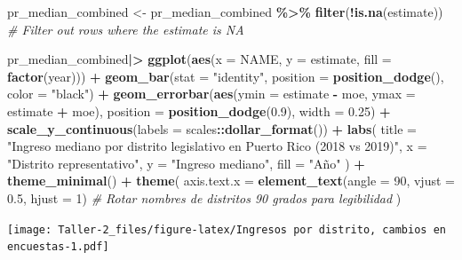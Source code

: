 \documentclass[
]{article}
\newenvironment{Shaded}{\begin{snugshade}}{\end{snugshade}}
\newcommand{\AttributeTok}[1]{\textcolor[rgb]{0.13,0.29,0.53}{#1}}
\newcommand{\CommentTok}[1]{\textcolor[rgb]{0.56,0.35,0.01}{\textit{#1}}}
\newcommand{\DecValTok}[1]{\textcolor[rgb]{0.00,0.00,0.81}{#1}}
\newcommand{\FloatTok}[1]{\textcolor[rgb]{0.00,0.00,0.81}{#1}}
\newcommand{\FunctionTok}[1]{\textcolor[rgb]{0.13,0.29,0.53}{\textbf{#1}}}
\newcommand{\NormalTok}[1]{#1}
\newcommand{\OtherTok}[1]{\textcolor[rgb]{0.56,0.35,0.01}{#1}}
\newcommand{\SpecialCharTok}[1]{\textcolor[rgb]{0.81,0.36,0.00}{\textbf{#1}}}
\newcommand{\StringTok}[1]{\textcolor[rgb]{0.31,0.60,0.02}{#1}}
\begin{document}
\begin{Shaded}
\begin{Highlighting}[]
\NormalTok{pr\_median\_combined }\OtherTok{\textless{}{-}}\NormalTok{ pr\_median\_combined }\SpecialCharTok{\%\textgreater{}\%}
  \FunctionTok{filter}\NormalTok{(}\SpecialCharTok{!}\FunctionTok{is.na}\NormalTok{(estimate))  }\CommentTok{\# Filter out rows where the estimate is NA}

\NormalTok{pr\_median\_combined}\SpecialCharTok{|\textgreater{}}
  \FunctionTok{ggplot}\NormalTok{(}\FunctionTok{aes}\NormalTok{(}\AttributeTok{x =}\NormalTok{ NAME, }\AttributeTok{y =}\NormalTok{ estimate, }\AttributeTok{fill =} \FunctionTok{factor}\NormalTok{(year))) }\SpecialCharTok{+}
  \FunctionTok{geom\_bar}\NormalTok{(}\AttributeTok{stat =} \StringTok{"identity"}\NormalTok{, }\AttributeTok{position =} \FunctionTok{position\_dodge}\NormalTok{(), }\AttributeTok{color =} \StringTok{"black"}\NormalTok{) }\SpecialCharTok{+}
  \FunctionTok{geom\_errorbar}\NormalTok{(}\FunctionTok{aes}\NormalTok{(}\AttributeTok{ymin =}\NormalTok{ estimate }\SpecialCharTok{{-}}\NormalTok{ moe, }\AttributeTok{ymax =}\NormalTok{ estimate }\SpecialCharTok{+}\NormalTok{ moe), }
                \AttributeTok{position =} \FunctionTok{position\_dodge}\NormalTok{(}\FloatTok{0.9}\NormalTok{), }\AttributeTok{width =} \FloatTok{0.25}\NormalTok{) }\SpecialCharTok{+}
  \FunctionTok{scale\_y\_continuous}\NormalTok{(}\AttributeTok{labels =}\NormalTok{ scales}\SpecialCharTok{::}\FunctionTok{dollar\_format}\NormalTok{()) }\SpecialCharTok{+}
  \FunctionTok{labs}\NormalTok{(}
    \AttributeTok{title =} \StringTok{"Ingreso mediano por distrito legislativo en Puerto Rico (2018 vs 2019)"}\NormalTok{,}
    \AttributeTok{x =} \StringTok{"Distrito representativo"}\NormalTok{,}
    \AttributeTok{y =} \StringTok{"Ingreso mediano"}\NormalTok{,}
    \AttributeTok{fill =} \StringTok{"Año"}
\NormalTok{  ) }\SpecialCharTok{+}
  \FunctionTok{theme\_minimal}\NormalTok{() }\SpecialCharTok{+}
  \FunctionTok{theme}\NormalTok{(}
    \AttributeTok{axis.text.x =} \FunctionTok{element\_text}\NormalTok{(}\AttributeTok{angle =} \DecValTok{90}\NormalTok{, }\AttributeTok{vjust =} \FloatTok{0.5}\NormalTok{, }\AttributeTok{hjust =} \DecValTok{1}\NormalTok{)  }\CommentTok{\# Rotar nombres de distritos 90 grados para legibilidad}
\NormalTok{  )}
\end{Highlighting}
\end{Shaded}

\texttt{[image: Taller-2\_files/figure-latex/Ingresos por distrito, cambios en encuestas-1.pdf]}
\end{document}
